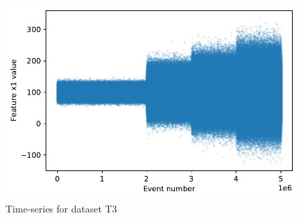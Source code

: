 \documentclass[sigconf]{acmart}
\begin{document}
\begin{figure}[!htb]
    \begin{center}
      \includegraphics[scale=0.5]{figures/timeseries-t3.pdf}
      \caption{Time-series for dataset T3}
     \label{fig:timeseries-t3}
    \end{center}
\end{figure}
\end{document}
